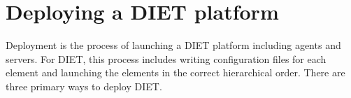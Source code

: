 
\chapter{Deploying a DIET platform}
\label{ch:deploying}

Deployment is the process of launching a DIET platform including agents
and servers.  For DIET, this process includes writing configuration
files for each element and launching the elements in the correct
hierarchical order. There are three primary ways to deploy DIET.

